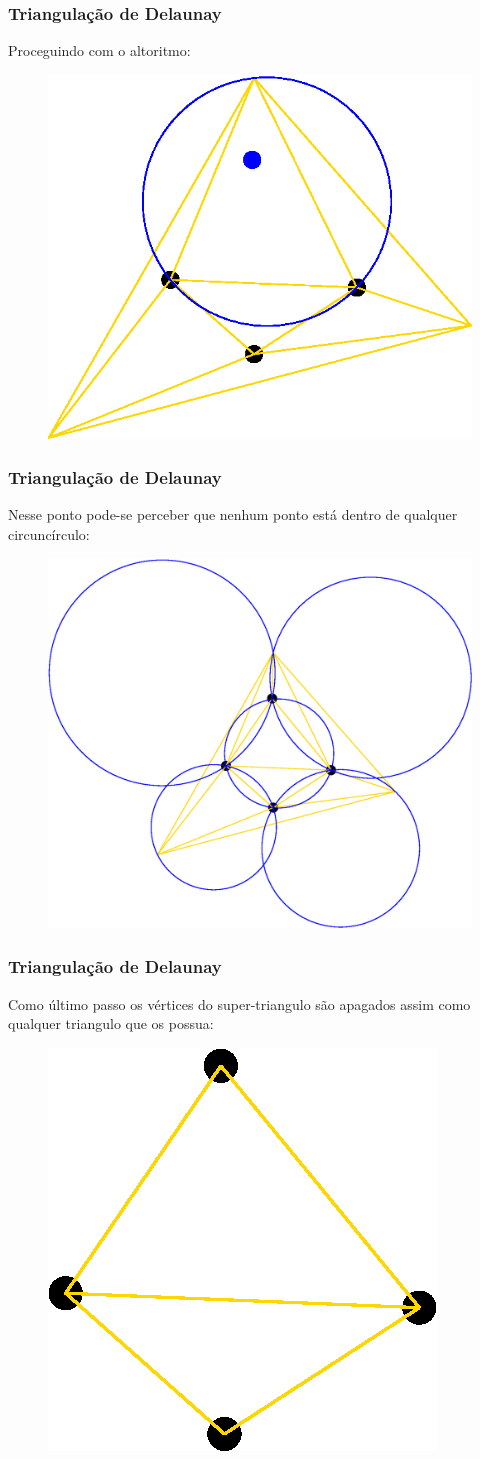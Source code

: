 \documentclass{beamer}
\begin{document}
\begin{frame}
  \frametitle{Triangulação de Delaunay}
  Proceguindo com o altoritmo:

  \begin{figure}
    \includegraphics[width=0.5\linewidth]{dela12.eps}
  \end{figure}
\end{frame}

\begin{frame}
  \frametitle{Triangulação de Delaunay}
  Nesse ponto pode-se perceber que nenhum ponto está dentro de qualquer circuncírculo:

  \begin{figure}
    \includegraphics[width=0.8\linewidth]{dela13.eps}
  \end{figure}
\end{frame}

\begin{frame}
  \frametitle{Triangulação de Delaunay}
  Como último passo os vértices do super-triangulo são apagados assim como qualquer triangulo que os possua:

  \begin{figure}
    \includegraphics[width=0.3\linewidth]{dela14.eps}
  \end{figure}
\end{frame}
\end{document}
